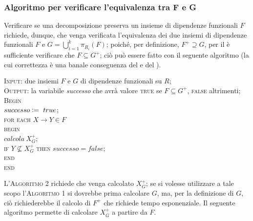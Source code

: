 \subsubsection{Algoritmo per verificare l'equivalenza tra F e G}
Verificare se una decomposizione preserva un insieme di dipendenze funzionali $F$ richiede, dunque,
che venga verificata l'equivalenza dei due insiemi di dipendenze funzionali $F$ e $G = \bigcup_{i=1}^k
\pi_{R_i}(F)$; poiché, per definizione, $F^+ \supseteq G$, per il  è sufficiente
verificare che $F\subseteq G^+$; ciò può essere fatto con il seguente algoritmo (la cui correttezza è una 
banale conseguenza del  e del ).

\begin{alg}
\textsc{Input:} due insiemi $F$ e $G$ di dipendenze funzionali su $R$;\\
\textsc{Output:} la variabile \emph{successo} che avrà valore \textsc{true} se $F\subseteq G^+$, \textsc{false}
altrimenti;\\
\textsc{Begin}\\
$successo\vcentcolon=\ true$;\\
\textsc{for each} $X \rightarrow Y \in F$\\
\indent \textsc{begin}\\
\indent $calcola\ X_{G}^+$;\\
\indent \textsc{if} $Y \not\subseteq X^+_G$ \textsc{then} $successo=false$;\\
\indent \textsc{end}\\
\textsc{end}
\end{alg}

\noindent L'\textsc{Algoritmo 2} richiede che venga calcolato $X^{+}_G$; se si volesse utilizzare a tale scopo l'\textsc{Algoritmo 1}
si dovrebbe prima calcolare $G$, ma, per la definizione di $G$, ciò richiederebbe il calcolo di $F^+$ che
richiede tempo esponenziale. Il seguente algoritmo permette di calcolare $X^{+}_G$ a partire da $F$.

